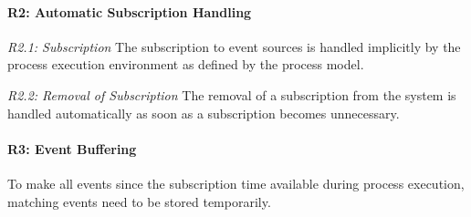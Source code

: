 \paragraph{R2: Automatic Subscription Handling\newline}

\textit{R2.1: Subscription}
The subscription to event sources is handled implicitly by the process execution environment as defined by the process model.

\textit{R2.2: Removal of Subscription}
The removal of a subscription from the system is handled automatically as soon as a subscription becomes unnecessary.

\paragraph{R3: Event Buffering\newline}
To make all events since the subscription time available during process execution, matching events need to be stored temporarily.

